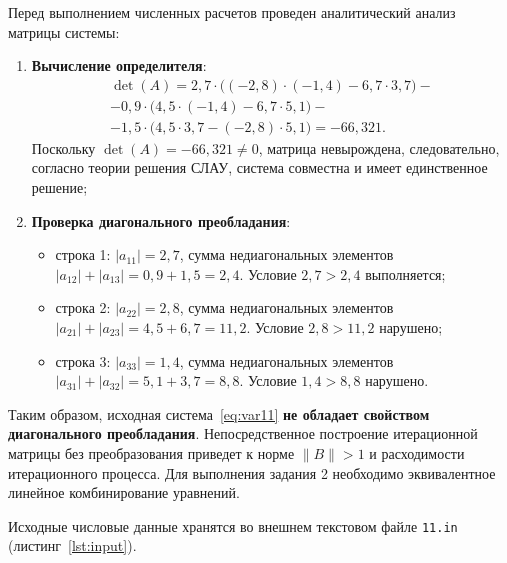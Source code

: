 Перед выполнением численных расчетов проведен аналитический анализ матрицы системы:
\begin{enumerate}
    \item \textbf{Вычисление определителя}:
    \begin{multline}
        \det(A) = 2{,}7 \cdot \big((-2{,}8) \cdot (-1{,}4) - 6{,}7 \cdot 3{,}7\big) - \\
        - 0{,}9 \cdot \big(4{,}5 \cdot (-1{,}4) - 6{,}7 \cdot 5{,}1\big) - \\
        - 1{,}5 \cdot \big(4{,}5 \cdot 3{,}7 - (-2{,}8) \cdot 5{,}1\big) = -66{,}321.
    \end{multline}
    Поскольку $\det(A) = -66{,}321 \neq 0$, матрица невырождена, следовательно, согласно теории решения СЛАУ, система совместна и имеет единственное решение;
    \item \textbf{Проверка диагонального преобладания}:
    \begin{itemize}
        \item строка 1: $|a_{11}| = 2{,}7$, сумма недиагональных элементов $|a_{12}| + |a_{13}| = 0{,}9 + 1{,}5 = 2{,}4$. Условие $2{,}7 > 2{,}4$ выполняется;
        \item строка 2: $|a_{22}| = 2{,}8$, сумма недиагональных элементов $|a_{21}| + |a_{23}| = 4{,}5 + 6{,}7 = 11{,}2$. Условие $2{,}8 > 11{,}2$ нарушено;
        \item строка 3: $|a_{33}| = 1{,}4$, сумма недиагональных элементов $|a_{31}| + |a_{32}| = 5{,}1 + 3{,}7 = 8{,}8$. Условие $1{,}4 > 8{,}8$ нарушено.
    \end{itemize}
\end{enumerate}

Таким образом, исходная система~\eqref{eq:var11} \textbf{не обладает свойством диагонального преобладания}. Непосредственное построение итерационной матрицы без преобразования приведет к норме $\|B\| > 1$ и расходимости итерационного процесса. Для выполнения задания 2 необходимо эквивалентное линейное комбинирование уравнений.

Исходные числовые данные хранятся во внешнем текстовом файле \texttt{11.in} (листинг~\ref{lst:input}).

\begin{listing}[H]
    \caption{Содержимое входного файла 11.in}
    \label{lst:input}
\end{listing}
